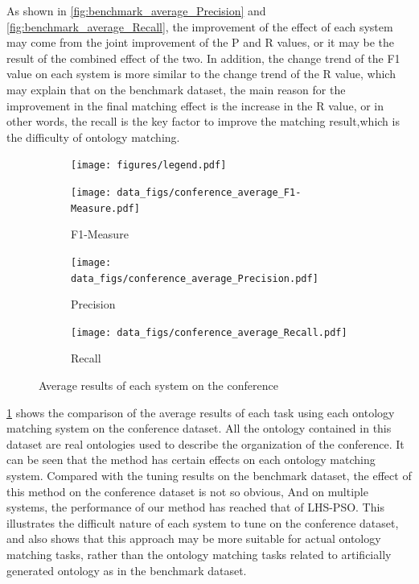 \documentclass[twoside]{article}
\begin{document}
As shown in \ref{fig:benchmark_average_Precision} and \ref{fig:benchmark_average_Recall}, the improvement of the effect of each system may come from the joint improvement of the P and R values, or it may be the result of the combined effect of the two.
In addition, the change trend of the F1 value on each system is more similar to the change trend of the R value, which may explain that on the benchmark dataset, the main reason for the improvement in the final matching effect is the increase in the R value, or in other words, the recall is the key factor to improve the matching result,which is the difficulty of ontology matching.

\begin{figure}[htb!]\centering
\begin{subfigure}{\textwidth}
	\centering
\texttt{[image: figures/legend.pdf]}
\end{subfigure}
\begin{subfigure}{0.3\textwidth}
	\centering
\texttt{[image: data\_figs/conference\_average\_F1-Measure.pdf]}
\caption{F1-Measure}
\label{fig:conference_average_F1-Measure}
\end{subfigure}
\begin{subfigure}{0.3\textwidth}
	\centering
\texttt{[image: data\_figs/conference\_average\_Precision.pdf]}
\caption{Precision}
\label{fig:conference_average_Precision}
\end{subfigure}
\begin{subfigure}{0.3\textwidth}
	\centering
\texttt{[image: data\_figs/conference\_average\_Recall.pdf]}
\caption{Recall}
\label{fig:conference_average_Recall}
\end{subfigure}
\caption{Average results of each system on the conference}
\end{figure}

\ref{fig:conference_average_F1-Measure} shows the comparison of the average results of each task using each ontology matching system on the conference dataset.
All the ontology contained in this dataset are real ontologies used to describe the organization of the conference.
It can be seen that the method has certain effects on each ontology matching system.
Compared with the tuning results on the benchmark dataset, the effect of this method on the conference dataset is not so obvious, And on multiple systems, the performance of our method has reached that of LHS-PSO.
This illustrates the difficult nature of each system to tune on the conference dataset, and also shows that this approach may be more suitable for actual ontology matching tasks, rather than the ontology matching tasks related to artificially generated ontology as in the benchmark dataset.
\end{document}
